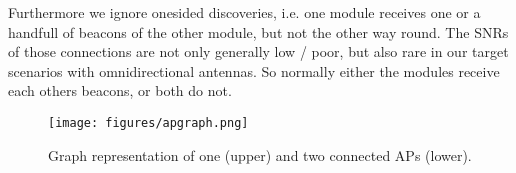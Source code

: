     Furthermore we ignore onesided discoveries, i.e. one module receives one or a handfull of beacons of the other module, but not the other way round.
    The SNRs of those connections are not only generally low / poor, but also rare in our target scenarios with omnidirectional antennas.
    So normally either the modules receive each others beacons, or both do not.
    
    \begin{figure}[th!]
      \centering
      \texttt{[image: figures/apgraph.png]}
      \caption{Graph representation of one (upper) and two connected APs (lower).}
      \label{fig:apgraph}
    \end{figure}
